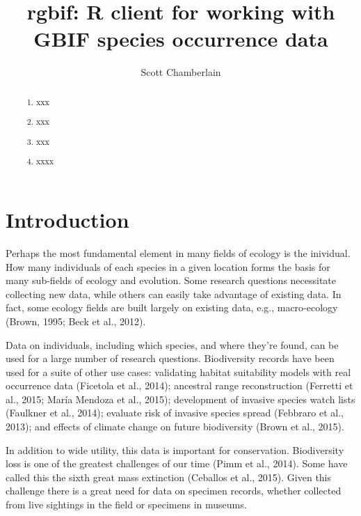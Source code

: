\documentclass[author-year, review, 11pt]{components/elsarticle} %
\begin{document}
\begin{frontmatter}

  \title{rgbif: R client for working with GBIF species occurrence data}
    \author[cstar]{Scott Chamberlain}
      \address[cstar]{University of California, Berkeley, CA, USA}    
  
  \begin{abstract}
  \begin{enumerate}
  \def\labelenumi{\arabic{enumi}.}
  \item
    xxx
  \item
    xxx
  \item
    xxx
  \item
    xxxx
  \end{enumerate}
  \end{abstract}
  
 \end{frontmatter}


\section{Introduction}\label{introduction}

Perhaps the most fundamental element in many fields of ecology is the
inividual. How many individuals of each species in a given location
forms the basis for many sub-fields of ecology and evolution. Some
research questions necessitate collecting new data, while others can
easily take advantage of existing data. In fact, some ecology fields are
built largely on existing data, e.g., macro-ecology (Brown, 1995; Beck
et al., 2012).

Data on individuals, including which species, and where they're found,
can be used for a large number of research questions. Biodiversity
records have been used for a suite of other use cases: validating
habitat suitability models with real occurrence data (Ficetola et al.,
2014); ancestral range reconstruction (Ferretti et al., 2015; Mar{í}a
Mendoza et al., 2015); development of invasive species watch lists
(Faulkner et al., 2014); evaluate risk of invasive species spread
(Febbraro et al., 2013); and effects of climate change on future
biodiversity (Brown et al., 2015).

In addition to wide utility, this data is important for conservation.
Biodiversity loss is one of the greatest challenges of our time (Pimm et
al., 2014). Some have called this the sixth great mass extinction
(Ceballos et al., 2015). Given this challenge there is a great need for
data on specimen records, whether collected from live sightings in the
field or specimens in museums.
\end{document}
